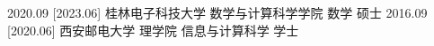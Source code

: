 \documentclass[zh]{resume}
\begin{document}
\begin{educations}
  \education%
    {2020.09}%
    [2023.06]%
    {桂林电子科技大学}%
    {数学与计算科学学院}%
    {数学}%
    {硕士}
  \separator{0.2ex}
  \education%
    {2016.09}%
    [2020.06]%
    {西安邮电大学}%
    {理学院}%
    {信息与计算科学}%
    {学士}
\end{educations}
\end{document}
